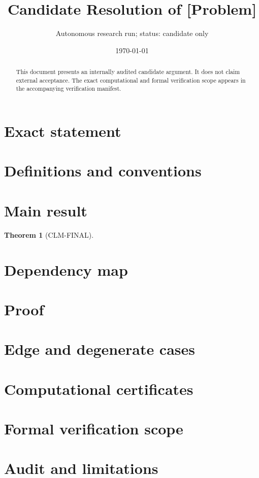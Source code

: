 \documentclass[11pt]{article}
\title{Candidate Resolution of [Problem]}
\author{Autonomous research run; status: candidate only}
\date{\today}
\newtheorem{theorem}{Theorem}
\theoremstyle{definition}
\theoremstyle{remark}
\begin{document}
\maketitle

\begin{abstract}
This document presents an internally audited candidate argument. It does not
claim external acceptance. The exact computational and formal verification
scope appears in the accompanying verification manifest.
\end{abstract}

\section{Exact statement}

\section{Definitions and conventions}

\section{Main result}
\begin{theorem}[CLM-FINAL]
\end{theorem}

\section{Dependency map}

\section{Proof}

\section{Edge and degenerate cases}

\section{Computational certificates}

\section{Formal verification scope}

\section{Audit and limitations}
\end{document}
